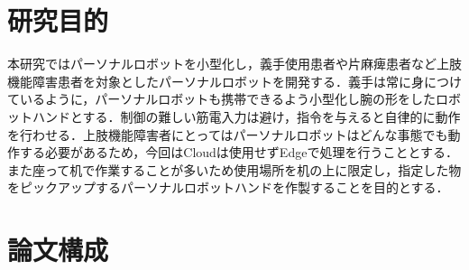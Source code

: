 \section{研究目的}

本研究ではパーソナルロボットを小型化し，義手使用患者や片麻痺患者など上肢機能障害患者を対象としたパーソナルロボットを開発する．義手は常に身につけているように，パーソナルロボットも携帯できるよう小型化し腕の形をしたロボットハンドとする．制御の難しい筋電入力は避け，指令を与えると自律的に動作を行わせる．上肢機能障害者にとってはパーソナルロボットはどんな事態でも動作する必要があるため，今回はCloudは使用せずEdgeで処理を行うこととする．また座って机で作業することが多いため使用場所を机の上に限定し，指定した物をピックアップするパーソナルロボットハンドを作製することを目的とする．

\section{論文構成}


